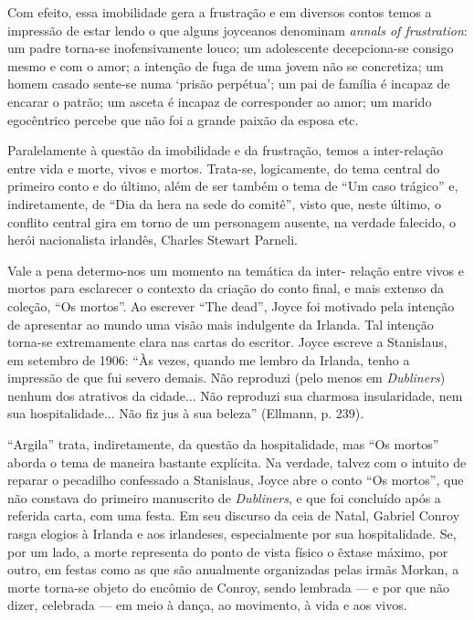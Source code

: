 Com efeito, essa imobilidade gera a frustração e em diversos contos
temos a impressão de estar lendo o que alguns joyceanos denominam
\textit{annals of frustration}: um padre torna-se inofensivamente louco; um
adolescente decepciona-se consigo mesmo e com o amor; a intenção de
fuga de uma jovem não se concretiza; um homem casado sente-se numa
`prisão perpétua'; um pai de família é incapaz de encarar o patrão;
um asceta é incapaz de corresponder ao amor; um marido egocêntrico
percebe que não foi a grande paixão da esposa etc.

Paralelamente à questão da imobilidade e da frustração, temos a
inter-relação entre vida e morte, vivos e mortos. Trata-se,
logicamente, do tema central do primeiro conto e do último, além de ser
também o tema de ``Um caso trágico'' e, indiretamente, de ``Dia
da hera na sede do comitê'', visto que, neste último, o conflito
central gira em torno de um personagem ausente, na verdade falecido, o
herói nacionalista irlandês, Charles Stewart Parneli.

Vale a pena determo-nos um momento na temática da inter- relação entre
vivos e mortos para esclarecer o contexto da criação do conto final, e
mais extenso da coleção, ``Os mortos''. Ao escrever ``The
dead'', Joyce foi motivado pela intenção de apresentar ao mundo uma
visão mais indulgente da Irlanda. Tal intenção torna-se extremamente
clara nas cartas do escritor. Joyce escreve a Stanislaus, em setembro
de 1906: ``Às vezes, quando me lembro da Irlanda, tenho a impressão
de que fui severo demais. Não reproduzi (pelo menos em
\textit{Dubliners}) nenhum dos atrativos da cidade... Não reproduzi sua charmosa
insularidade, nem sua hospitalidade... Não fiz jus à sua beleza''
(Ellmann, p. 239).

``Argila'' trata, indiretamente, da questão da hospitalidade, mas
``Os mortos'' aborda o tema de maneira bastante explícita. Na
verdade, talvez com o intuito de reparar o pecadilho confessado a
Stanislaus, Joyce abre o conto ``Os mortos'', que não constava do
primeiro manuscrito de \textit{Dubliners}, e que foi concluído após a referida
carta, com uma festa. Em seu discurso da ceia de Natal, Gabriel Conroy
rasga elogios à Irlanda e aos irlandeses, especialmente por sua
hospitalidade. Se, por um lado, a morte representa do ponto de vista
físico o êxtase máximo, por outro, em festas como as que são
anualmente organizadas pelas irmãs Morkan, a morte torna-se objeto do
encômio de Conroy, sendo lembrada --- e por que não dizer, celebrada
--- em meio à dança, ao movimento, à vida e aos vivos.

